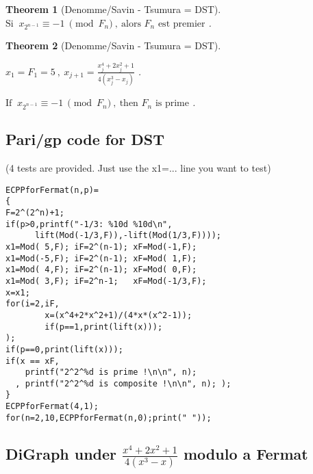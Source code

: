 \documentclass[latin1]{quadrature}
\newtheorem{theorem}{Theorem}
\newif\ifenfrancais
\begin{document}
\begin{article}
\begin{article}
\begin{theorem}[Denomme/Savin - Tsumura = DST]
\vspace{.05in}
$\text{Si } \ x_{2^{n-1}} \equiv -1 \ \pmod{F_n} \ , \ \text{alors } F_n  \text{ est premier} $ .

\end{theorem}
\else
\begin{theorem}[Denomme/Savin - Tsumura = DST]
\ 
\vspace{.04in}

$x_1=F_1=5 \ , \   x_{j+1} = \frac{\displaystyle x_j^4+2x_j^2+1}{\displaystyle 4(x_j^3-x_j)}$ .

\vspace{.05in}
$\text{If } \ x_{2^{n-1}} \equiv -1 \ \pmod{F_n} \ , \ \text{then } F_n  \text{ is prime} $ .

\end{theorem}
\fi


\ifenfrancais
\subsection { Code en Pari/gp code pour DST }
\else
\subsection { Pari/gp code for DST }
\fi

\ifenfrancais
4 tests diff\'erents sont fournis. Utiliser une ligne x1=... pour utiliser le test de votre choix)
\else
(4 tests are provided. Just use the x1=... line you want to test)
\fi

\small
\begin{verbatim}
ECPPforFermat(n,p)=
{
F=2^(2^n)+1;
if(p>0,printf("-1/3: %10d %10d\n",
      lift(Mod(-1/3,F)),-lift(Mod(1/3,F))));
x1=Mod( 5,F); iF=2^(n-1); xF=Mod(-1,F);
x1=Mod(-5,F); iF=2^(n-1); xF=Mod( 1,F);
x1=Mod( 4,F); iF=2^(n-1); xF=Mod( 0,F);
x1=Mod( 3,F); iF=2^n-1;   xF=Mod(-1/3,F);
x=x1;
for(i=2,iF,
        x=(x^4+2*x^2+1)/(4*x*(x^2-1));
        if(p==1,print(lift(x)));
);
if(p==0,print(lift(x)));
if(x == xF,
    printf("2^2^%d is prime !\n\n", n);
  , printf("2^2^%d is composite !\n\n", n); );
}
ECPPforFermat(4,1);
for(n=2,10,ECPPforFermat(n,0);print(" "));
\end{verbatim}
\normalsize


\ifenfrancais
\subsection { DiGraph sous $\frac{\displaystyle x^4+2x^2+1}{\displaystyle 4(x^3-x)}$ modulo un nombre de Fermat }
\else
\subsection { DiGraph under $\frac{\displaystyle x^4+2x^2+1}{\displaystyle 4(x^3-x)}$ modulo a Fermat }
\fi


\end{article}
\end{article}
\end{document}
